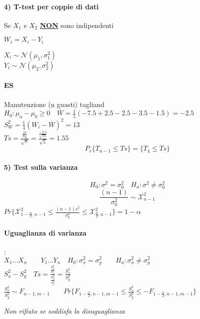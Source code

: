 \documentclass[]{article}
\begin{document}
    \paragraph{4) T-test per coppie di dati}
    Se $X_1$ e $X_2$ \underline{\textbf{NON}} sono indipendenti \\
    \begin{minipage}{0.5\textwidth}
        $W_i = X_i - Y_i$
    \end{minipage}
    \begin{minipage}{0.5\textwidth}
        $X_i \sim \mathcal{N}(\mu_1, \sigma_1^2)$ \\
        $Y_i \sim \mathcal{N}(\mu_2, \sigma_2^2)$
    \end{minipage}
    \paragraph{ES} Manutenzione (n guasti) tagliand \\[2ex]
    $H_0 : \mu_a - \mu_b \geq 0 \quad \overline{W} = \frac{1}{5}(-7.5 + 2.5 - 2.5 - 3.5 -1.5) = -2.5$ \\[2ex]
    $S^2_W = \frac{1}{4}(W_i - \overline{W})^2 = 13$ \\[2ex]
    $Ts = \frac{\frac{\overline{W}}{S_W}}{\sqrt{n}} = \frac{\frac{-2.5}{\sqrt{13}}}{\sqrt{5}} = 1.55$
    \[ P_r \{ T_{n-1} \leq Ts \} = \{ T_4 \leq Ts \}\]
    \paragraph{5) Test sulla varianza}
    \[ H_0 : \sigma^2 = \sigma^2_0 \quad H_a : \sigma^2 \not = \sigma^2_0 \]
    \[ \frac{(n-1)}{\sigma^2_0} \sim \mathcal{X}^2_{n-1} \]
    $Pr \{ \mathcal{X}^2_{1-\frac{\alpha}{2}, n-1} \leq \frac{(n-1) s^2}{\sigma^2_0} \leq \mathcal{X}^2_{\frac{\alpha}{2}, n-1}\} = 1 -\alpha$
    \paragraph{Uguaglianza di varianza}: \\
    $X_1 \ldots X_n \qquad Y_1 \ldots Y_n \quad H_0 : \sigma^2_x = \sigma^2_y \qquad H_a : \sigma^2_x \not = \sigma^2_y$ \\[2ex]
    $\displaystyle S^2_x - S^2_y \quad Ts = \frac{\frac{S^2_x}{\sigma^2_x}}{\frac{S^2_y}{\sigma^2_y}} = \frac{S^2_x}{S^2_y}$ \\[4ex]
    $\frac{S^2_x}{S^2_y} \sim F_{n-1, m-1} \qquad Pr \{ F_{1-\frac{\alpha}{2}, n-1, m-1} \leq \frac{S^2_x}{S^2_y} \leq - F_{1-\frac{\alpha}{2}, n-1, m-1} \}$ \\
    \centerline{\textit{Non rifiuto se soddisfa la disuguaglianza}}
\end{document}
